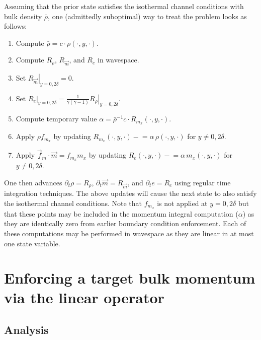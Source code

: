 \documentclass[letterpaper,11pt,nointlimits,reqno]{amsart}
\begin{document}
Assuming that the prior state satisfies the isothermal channel conditions with
bulk density $\bar{\rho}$, one (admittedly suboptimal) way to treat the
problem looks as follows:
\begin{enumerate}
  \item Compute $\bar{\rho} = c \cdot \rho\!\left(\cdot,y,\cdot\right)$.
  \item Compute $R_{\rho}$, $R_{\vec{m}}$, and $R_{e}$ in wavespace.
  \item Set $\left.R_{\vec{m}}\right|_{y=0,2\delta} = 0$.
  \item Set $\left.R_{e}\right|_{y=0,2\delta} =
        \frac{1}{\gamma\left(\gamma-1\right)}
        \left.R_{\rho}\right|_{y=0,2\delta}$.
  \item Compute temporary value $\alpha =
        \bar{\rho}^{-1} c \cdot R_{m_{x}}\!\left(\cdot,y,\cdot\right)$.
  \item Apply $\rho f_{m_x}$ by updating
        $R_{m_x}\!\left(\cdot,y,\cdot\right) -{}\!\!\!{}=
        \alpha \, \rho\!\left(\cdot,y,\cdot\right)$ for $y\neq0,2\delta$.
  \item Apply $\vec{f}_{m}\cdot\vec{m} = f_{m_x} m_x$ by updating
        $R_{e}\!\left(\cdot,y,\cdot\right) -{}\!\!\!{}=
        \alpha \, m_{x}\!\left(\cdot,y,\cdot\right)$
        for $y\neq0,2\delta$.
\end{enumerate}
One then advances $\partial_{t}\rho = R_{\rho}$, $\partial_{t} \vec{m} =
R_{\vec{m}}$, and $\partial_{t} e = R_{e}$ using regular time integration
techniques.  The above updates will cause the next state to also satisfy the
isothermal channel conditions.  Note that $f_{m_x}$ is not applied at
$y=0,2\delta$ but that these points may be included in the momentum integral
computation ($\alpha$) as they are identically zero from earlier boundary
condition enforcement.  Each of these computations may be performed in
wavespace as they are linear in at most one state variable.


\section{Enforcing a target bulk momentum via the linear operator}

\subsection{Analysis}
\end{document}
